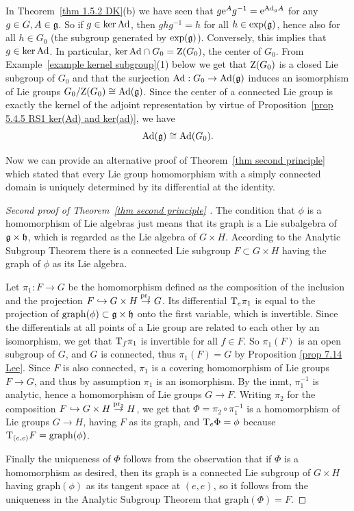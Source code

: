 \begin{example}
    In Theorem~\ref{thm 1.5.2 DK}(b) we have seen that $g\mathrm{e}^A g^{-1}=\mathrm{e}^{\mathrm{Ad}_g A}$ for any $g\in G,A\in\mathfrak{g}$. So if $g\in\ker \mathrm{Ad}$, then $ghg^{-1}=h$ for all $h\in \exp(\mathfrak{g})$, hence also for all $h\in G_0$ (the subgroup generated by $\exp(\mathfrak{g})$). Conversely, this implies that $g\in\ker \mathrm{Ad}$. In particular, $\ker\mathrm{Ad}\cap G_0=\mathrm{Z}(G_0)$, the center of $G_0$. From Example~\ref{example kernel subgroup}(1) below we get that $\mathrm{Z}(G_0)$ is a closed Lie subgroup of $G_0$ and that the surjection $\mathrm{Ad}:G_0\to \mathrm{Ad}(\mathfrak{g})$ induces an isomorphism of Lie groups $G_0\slash \mathrm{Z}(G_0)\cong \mathrm{Ad}(\mathfrak{g})$. Since the center of a connected Lie group is exactly the kernel of
    the adjoint representation by virtue of Proposition~\ref{prop 5.4.5 RS1 ker(Ad) and ker(ad)}, we have 
    \[\mathrm{Ad}(\mathfrak{g})\cong \mathrm{Ad}(G_0).\]
\end{example}



Now we can provide an alternative proof of Theorem~\ref{thm second principle} which stated that every Lie group homomorphism with a simply connected domain is uniquely determined by its differential at the identity.


\begin{proof}[Second proof of Theorem~\ref{thm second principle} {{\cite[Cor.~1.10.5]{DK}}}]
    The condition that $\phi$ is a homomorphism of Lie algebras just means that its graph is a Lie subalgebra of $\mathfrak{g}\times\mathfrak{h}$, which is regarded as the Lie algebra of $G\times H$. According to the Analytic Subgroup Theorem there is a connected Lie subgroup $F\subset G\times H$ having the graph of $\phi$ as its Lie algebra.

    Let $\pi_1:F\to G$ be the homomorphism defined as the composition of the inclusion and the projection $F\hookrightarrow G\times H\overset{\operatorname{pr}_1}{\to} G$. Its differential $\mathrm{T}_e \pi_1$ is equal to the projection of $\mathrm{graph}(\phi)\subset \mathfrak{g}\times\mathfrak{h}$ onto the first variable, which is invertible. Since the differentials at all points of a Lie group are related to each other by an isomorphism, we get that $\mathrm{T}_f\pi_1$ is invertible for all $f\in F$. So $\pi_1(F)$ is an open subgroup of $G$, and $G$ is connected, thus $\pi_1(F)=G$ by Proposition \ref{prop 7.14 Lee}. Since $F$ is also connected, $\pi_1$ is a covering homomorphism of Lie groups $F\to G$, and thus by assumption $\pi_1$ is an isomorphism. By the \gls{inmt}, $\pi_1^{-1}$ is analytic, hence a homomorphism of Lie groups $G\to F$. Writing $\pi_2$ for the composition $F\hookrightarrow G\times H\overset{\operatorname{pr}_2}{\to} H$, we get that $\Phi=\pi_2\circ \pi_1^{-1}$ is a homomorphism of Lie groups $G\to H$, having $F$ as its graph, and $\mathrm{T}_e \Phi=\phi$ because $\mathrm{T}_{(e,e)}F=\mathrm{graph}(\phi)$.

    Finally the uniqueness of $\Phi$ follows from the observation that if $\Phi$ is a homomorphism as desired, then its graph is a connected Lie subgroup of $G\times H$ having $\mathrm{graph}(\phi)$ as its tangent space at $(e,e)$, so it follows from the uniqueness in the Analytic Subgroup Theorem that $\mathrm{graph}(\Phi)=F$.
\end{proof}



